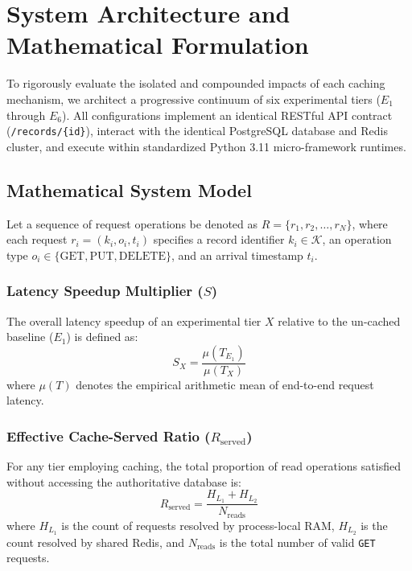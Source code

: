 \documentclass[conference]{IEEEtran}
\begin{document}
\section{System Architecture and Mathematical Formulation}

To rigorously evaluate the isolated and compounded impacts of each caching mechanism, we architect a progressive continuum of six experimental tiers ($E_1$ through $E_6$). All configurations implement an identical RESTful API contract (\texttt{/records/\{id\}}), interact with the identical PostgreSQL database and Redis cluster, and execute within standardized Python 3.11 micro-framework runtimes.

\subsection{Mathematical System Model}
Let a sequence of request operations be denoted as $R = \{r_1, r_2, \dots, r_N\}$, where each request $r_i = (k_i, o_i, t_i)$ specifies a record identifier $k_i \in \mathcal{K}$, an operation type $o_i \in \{\text{GET}, \text{PUT}, \text{DELETE}\}$, and an arrival timestamp $t_i$.

\subsubsection{Latency Speedup Multiplier ($S$)}
The overall latency speedup of an experimental tier $X$ relative to the un-cached baseline ($E_1$) is defined as:
\begin{equation}
S_X = \frac{\mu(T_{E_1})}{\mu(T_X)}
\end{equation}
where $\mu(T)$ denotes the empirical arithmetic mean of end-to-end request latency.

\subsubsection{Effective Cache-Served Ratio ($R_{\text{served}}$)}
For any tier employing caching, the total proportion of read operations satisfied without accessing the authoritative database is:
\begin{equation}
R_{\text{served}} = \frac{H_{L_1} + H_{L_2}}{N_{\text{reads}}}
\end{equation}
where $H_{L_1}$ is the count of requests resolved by process-local RAM, $H_{L_2}$ is the count resolved by shared Redis, and $N_{\text{reads}}$ is the total number of valid \texttt{GET} requests.
\end{document}
